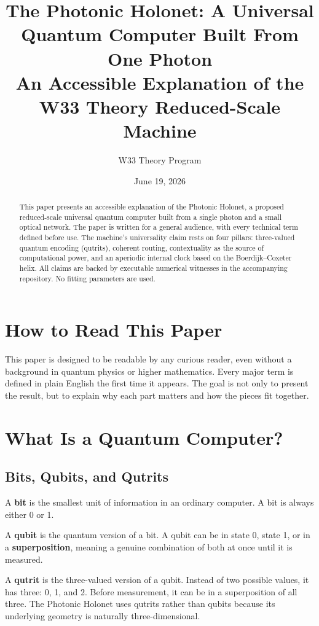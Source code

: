 \documentclass[11pt]{article}
\title{\textbf{The Photonic Holonet: A Universal Quantum Computer Built From One Photon}\\
\large An Accessible Explanation of the W33 Theory Reduced-Scale Machine}
\author{W33 Theory Program}
\date{June 19, 2026}
\begin{document}
\maketitle

\begin{abstract}
This paper presents an accessible explanation of the Photonic Holonet, a proposed reduced-scale universal quantum computer built from a single photon and a small optical network. The paper is written for a general audience, with every technical term defined before use. The machine's universality claim rests on four pillars: three-valued quantum encoding (qutrits), coherent routing, contextuality as the source of computational power, and an aperiodic internal clock based on the Boerdijk--Coxeter helix. All claims are backed by executable numerical witnesses in the accompanying repository. No fitting parameters are used.
\end{abstract}

\section{How to Read This Paper}
This paper is designed to be readable by any curious reader, even without a background in quantum physics or higher mathematics. Every major term is defined in plain English the first time it appears. The goal is not only to present the result, but to explain why each part matters and how the pieces fit together.

\section{What Is a Quantum Computer?}

\subsection{Bits, Qubits, and Qutrits}
A \textbf{bit} is the smallest unit of information in an ordinary computer. A bit is always either 0 or 1.

A \textbf{qubit} is the quantum version of a bit. A qubit can be in state 0, state 1, or in a \textbf{superposition}, meaning a genuine combination of both at once until it is measured.

A \textbf{qutrit} is the three-valued version of a qubit. Instead of two possible values, it has three: 0, 1, and 2. Before measurement, it can be in a superposition of all three. The Photonic Holonet uses qutrits rather than qubits because its underlying geometry is naturally three-dimensional.
\end{document}

